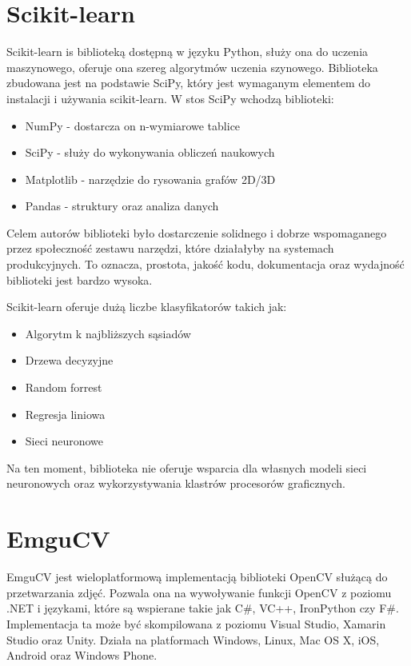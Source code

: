 \documentclass[brudnopis]{xmgr}
\begin{document}
\section{Scikit-learn}

Scikit-learn\cite{17} is biblioteką dostępną w języku Python, służy ona do uczenia maszynowego, oferuje ona szereg algorytmów uczenia szynowego. Biblioteka zbudowana jest na podstawie SciPy, który jest wymaganym elementem do instalacji i używania scikit-learn. W stos SciPy wchodzą biblioteki:

\begin{itemize}
\item
NumPy - dostarcza on n-wymiarowe tablice
\item
SciPy - służy do wykonywania obliczeń naukowych
\item
Matplotlib - narzędzie do rysowania grafów 2D/3D
\item
Pandas - struktury oraz analiza danych
\end{itemize}

Celem autorów biblioteki było dostarczenie solidnego i dobrze wspomaganego przez społeczność zestawu narzędzi, które działałyby na systemach produkcyjnych. To oznacza,  prostota, jakość kodu, dokumentacja oraz wydajność biblioteki jest bardzo wysoka.

Scikit-learn oferuje dużą liczbe klasyfikatorów takich jak:
\begin{itemize}
\item
Algorytm k najbliższych sąsiadów
\item
Drzewa decyzyjne
\item
Random forrest
\item
Regresja liniowa
\item
Sieci neuronowe
\end{itemize}

Na ten moment, biblioteka nie oferuje wsparcia dla własnych modeli sieci neuronowych oraz wykorzystywania klastrów procesorów graficznych.

\section{EmguCV}

EmguCV\cite{18} jest wieloplatformową implementacją biblioteki OpenCV służącą do przetwarzania zdjęć. Pozwala ona na wywoływanie funkcji OpenCV z poziomu .NET i językami, które są wspierane takie jak C\#, VC++, IronPython czy F\#. Implementacja ta może być skompilowana z poziomu Visual Studio, Xamarin Studio oraz Unity. Działa na platformach Windows, Linux, Mac OS X, iOS, Android oraz Windows Phone.
\end{document}
